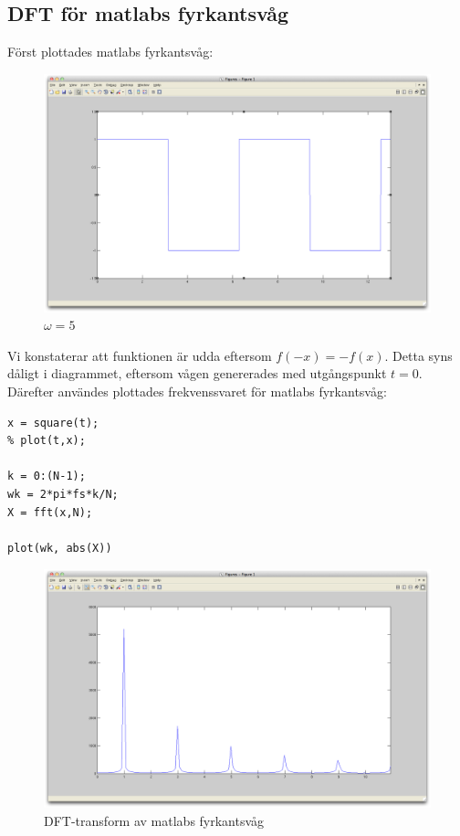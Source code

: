 \documentclass[]{article}
\begin{document}
\subsection{DFT för matlabs fyrkantsvåg} %
Först plottades matlabs fyrkantsvåg:
\begin{figure}[htb]
  \centering
  \includegraphics[width=15.0cm]{matlabsquare.png}
  \caption{$\omega = 5$}
\end{figure}
Vi konstaterar att funktionen är udda eftersom $f(-x) = -f(x)$. Detta syns dåligt i diagrammet, eftersom vågen genererades med utgångspunkt $t = 0$. \\
Därefter användes plottades frekvenssvaret för matlabs fyrkantsvåg:
\begin{verbatim}
x = square(t);
% plot(t,x);

k = 0:(N-1);
wk = 2*pi*fs*k/N;
X = fft(x,N);

plot(wk, abs(X))
\end{verbatim}
\begin{figure}[htb]
  \centering
  \includegraphics[width=15.0cm]{matlabsquaredft.png}
  \caption{DFT-transform av matlabs fyrkantsvåg}
\end{figure}
\end{document}
